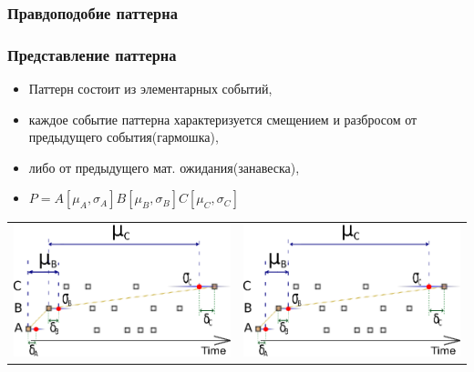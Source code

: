 \documentclass[smaller]{beamer}
\begin{document}
\subsubsection{Правдоподобие паттерна}
\begin{frame}
\frametitle{Представление паттерна}
 \begin{itemize}
  \item Паттерн состоит из элементарных событий,
  \item каждое событие паттерна характеризуется смещением и разбросом от предыдущего события(гармошка),
  \item либо от предыдущего мат. ожидания(занавеска),
  \item $P=A[\mu_A,\sigma_A]B[\mu_B,\sigma_B]C[\mu_C,\sigma_C]$
 \end{itemize}
\begin{tabular}[t]{p{12em}|p{12em}}
    \includegraphics[scale=0.6]{il1.eps} & \includegraphics[scale=0.6]{il2.eps}\\
\end{tabular}
\end{frame}  
\end{document}
